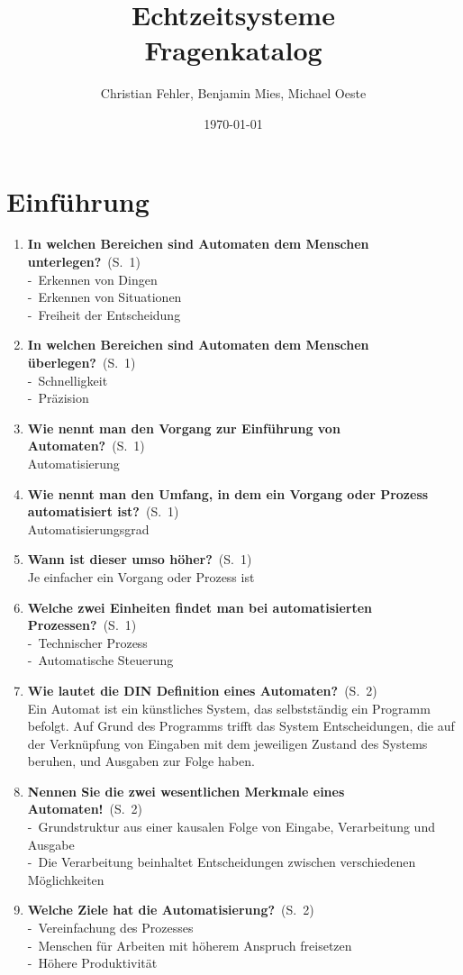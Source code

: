\documentclass[a4paper,12pt]{article}
\title{{\Huge Echtzeitsysteme}\\Fragenkatalog}
\author{{\Large Christian Fehler, Benjamin Mies, Michael Oeste}}
\date{\small\today}
\newcommand{\question}[3]{\pagebreak[3]\item {\textbf{#1?}}\ (S.\ #2)#3}
\newcommand{\statement}[3]{\pagebreak[3]\item {\textbf{#1!}}\ (S.\ #2)#3}
\newcommand{\catchword}[1]{\\-\ #1}
\newcommand{\normaltext}[1]{\\#1}
\newcommand{\page}[1]{#1}
\begin{document}
\maketitle
\newpage
\tableofcontents


\newpage
\section{Einführung}


\begin{enumerate}

  \question{In welchen Bereichen sind Automaten dem Menschen unterlegen}{\page{1}}
  {
    \catchword{Erkennen von Dingen}
    \catchword{Erkennen von Situationen}
    \catchword{Freiheit der Entscheidung}
  }

  \question{In welchen Bereichen sind Automaten dem Menschen überlegen}{\page{1}}
  {
    \catchword{Schnelligkeit}
    \catchword{Präzision}
  }

  \question{Wie nennt man den Vorgang zur Einführung von Automaten}{\page{1}}
  {
   \normaltext{Automatisierung}
  }

  \question{Wie nennt man den Umfang, in dem ein Vorgang oder Prozess automatisiert ist}{\page{1}}
  {
    \normaltext{Automatisierungsgrad}
  }

  \question{Wann ist dieser umso höher}{\page{1}}
  {
    \normaltext{Je einfacher ein Vorgang oder Prozess ist}
  }

  \question{Welche zwei Einheiten findet man bei automatisierten Prozessen}{\page{1}}
  {
    \catchword{Technischer Prozess}
    \catchword{Automatische Steuerung}
  }

  \question{Wie lautet die DIN Definition eines Automaten}{\page{2}}
  {
    \normaltext{Ein Automat ist ein künstliches System, das selbstständig ein Programm
                befolgt. Auf Grund des Programms trifft das System Entscheidungen, die
                auf der Verknüpfung von Eingaben mit dem jeweiligen Zustand des Systems
                beruhen, und Ausgaben zur Folge haben.}
  }

  \statement{Nennen Sie die zwei wesentlichen Merkmale eines Automaten}{\page{2}}
  {
    \catchword{Grundstruktur aus einer kausalen Folge von Eingabe, Verarbeitung und Ausgabe}
    \catchword{Die Verarbeitung beinhaltet Entscheidungen zwischen verschiedenen Möglichkeiten}
  }

  \question{Welche Ziele hat die Automatisierung}{\page{2}}
  {
    \catchword{Vereinfachung des Prozesses}
    \catchword{Menschen für Arbeiten mit höherem Anspruch freisetzen}
    \catchword{Höhere Produktivität}
  }


\end{enumerate}
\end{document}
